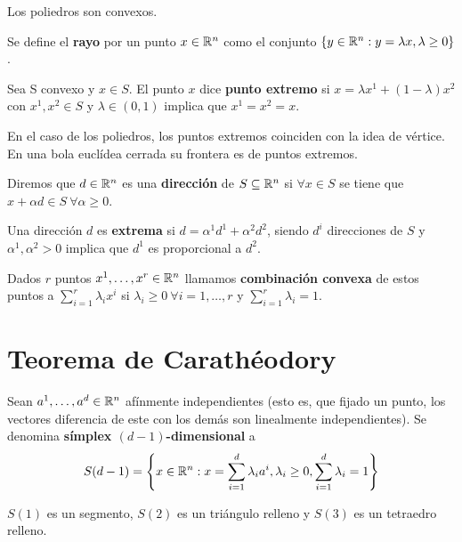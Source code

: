 \documentclass[PM.tex]{subfiles}
\begin{document}
\begin{coro}
Los poliedros son convexos.
\end{coro}

\begin{defi}
Se define el \textbf{rayo} por un punto $x\in\mathbb{R}^n$ como el conjunto $\left\{y\in\mathbb{R}^n: y=\lambda x, \lambda\geq 0\right\}$.
\end{defi}

\begin{defi}
Sea S convexo y $x\in S$. El punto $x$ dice \textbf{punto extremo} si $x=\lambda x^1 +(1-\lambda)x^2$ con $x^1,x^2\in S$ y $\lambda\in (0,1)$ implica que $x^1=x^2=x$.
\end{defi}
\begin{nota}  En el caso de los poliedros, los puntos extremos coinciden con la idea de vértice. En una bola euclídea cerrada su frontera es de puntos extremos.
\end{nota}

\begin{defi}
Diremos que $d\in\mathbb{R}^n$ es una \textbf{dirección} de $S\subseteq\mathbb{R}^n$ si $\forall x\in S$ se tiene que $x+\alpha d\in S\ \forall\alpha\geq 0$.
\end{defi}

\begin{defi} Una dirección $d$ es \textbf{extrema} si $d=\alpha^1d^1+\alpha^2d^2$, siendo $d^i$ direcciones de $S$ y $\alpha^1,\alpha^2>0$ implica que $d^1$ es proporcional a $d^2$.
\end{defi}

\begin{defi}
Dados $r$ puntos $x^1,\dots, x^r\in\mathbb{R}^n$ llamamos \textbf{combinación convexa} de estos puntos a $\sum_{i=1}^r\lambda_i x^i$ si $\lambda_i\geq 0\ \forall i=1,\dots, r$ y $\sum_{i=1}^r\lambda_i=1$.
\end{defi}

\section{Teorema de Carathéodory}
\begin{defi} Sean $a^1,\dots, a^d\in\mathbb{R}^n$ afínmente independientes (esto es, que fijado un punto, los vectores diferencia de este con los demás son linealmente independientes). Se denomina \textbf{símplex $(d-1)$-dimensional} a 
\[
S(d-1)= \left\{x\in\mathbb{R}^n:x=\sum_{i=1}^d\lambda_i a^i,\lambda_i\geq 0, \sum_{i=1}^d\lambda_i =1\right\}
\]
\end{defi}
\begin{example}
$S(1)$ es un segmento, $S(2)$ es un triángulo relleno y $S(3)$ es un tetraedro relleno.
\end{example}
\end{document}
